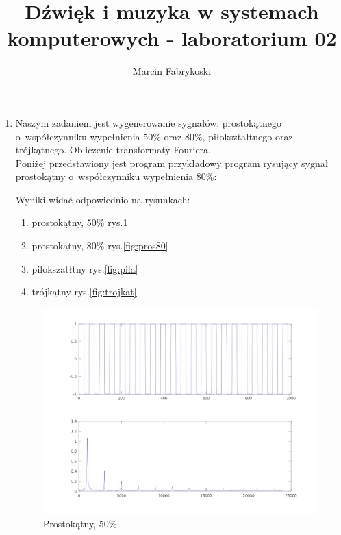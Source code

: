 \documentclass[11pt,a4paper]{article}
\title{Dźwięk i muzyka w systemach komputerowych - laboratorium 02}
\author{Marcin Fabrykoski}
\date{}
\begin{document}
\maketitle
\newpage
\begin{enumerate}
\item Naszym zadaniem jest wygenerowanie sygnałów: prostokątnego o~współczynniku wypełnienia 50\% oraz 80\%, piłokształtnego oraz trójkątnego. Obliczenie transformaty Fouriera.\\
Poniżej przedstawiony jest program przykładowy program rysujący sygnał prostokątny o~współczynniku wypełnienia 80\%:

Wyniki widać odpowiednio na rysunkach:
\begin{enumerate}
\item prostokątny, 50\% rys.\ref{fig:pros50}
\item prostokątny, 80\% rys.\ref{fig:pros80}
\item pilokszatłtny rys.\ref{fig:pila}
\item trójkątny rys.\ref{fig:trojkat}
\end{enumerate}
\begin{figure}
\hspace{-10em}
\includegraphics[scale=0.5]{proba1_1.png}
\caption{Prostokątny, 50\%}
\label{fig:pros50}
\end{figure}
\begin{figure}
\hspace{-10em}

\end{figure}
\end{enumerate}
\end{document}
